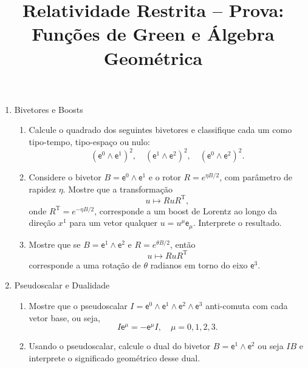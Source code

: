 \newif\ifuseseminar
\useseminartrue


\title{Relatividade Restrita -- Prova: Funções de Green e Álgebra Geométrica}

\newcommand{\e}{\mathsf{e}}



\begin{enumerate}

      \item Bivetores e Boosts

            \begin{enumerate}
                  \item Calcule o quadrado dos seguintes bivetores e classifique cada um
                        como tipo-tempo, tipo-espaço ou nulo:
                        $$(\e^0 \wedge \e^1)^2, \quad (\e^1 \wedge \e^2)^2, \quad (\e^0 \wedge \e^2)^2.$$

                  \item Considere o bivetor $B = \e^0 \wedge \e^1$ e o rotor $R =
                              e^{\eta B/2}$, com parâmetro de rapidez $\eta$. Mostre que a
                        transformação
                        $$u \mapsto R u R^\mathrm{T},$$ onde $R^\mathrm{T} = e^{-\eta
                                          B/2}$, corresponde a um boost de Lorentz ao longo da
                        direção $x^1$ para um vetor qualquer $u = u^\mu \e_\mu$.
                        Interprete o resultado.
                  \item Mostre que se $B = \e^1 \wedge \e^2$ e $R = e^{\theta B/2}$, então
                        $$u \mapsto R u R^\mathrm{T}$$ corresponde a uma rotação de
                        $\theta$ radianos em torno do eixo $\e^3$.
            \end{enumerate}

      \item Pseudoscalar e Dualidade

            \begin{enumerate}
                  \item Mostre que o pseudoscalar $I=\e^0 \wedge \e^1 \wedge \e^2 \wedge
                              \e^3$ anti-comuta com cada vetor base, ou seja,
                        $$I \e^\mu = - \e^\mu I, \quad \mu = 0,1,2,3.$$

                  \item Usando o pseudoscalar, calcule o dual do bivetor $B = \e^1
                              \wedge \e^2$ ou seja $IB$ e interprete o significado
                        geométrico desse dual.
            \end{enumerate}


\end{enumerate}
